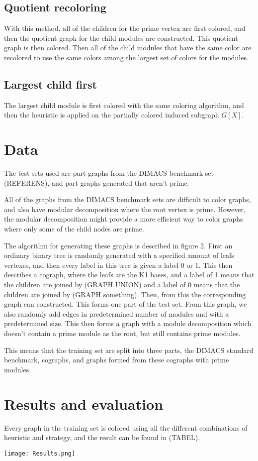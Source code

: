 \documentclass{amsart}
\begin{document}
\subsection{Quotient recoloring}

With this method, all of the children for the prime vertex are first colored,
and then the quotient graph for the child modules are constructed. This quotient
graph is then colored. Then all of the child modules that have the same color
are recolored to use the same colors among the largest set of colors for the
modules.



\subsection{Largest child first}

The largest child module is first colored with the same coloring algorithm, and
then the heuristic is applied on the partially colored induced subgraph 
$G[X]$.


\section{Data}
\label{sec:Data}

The test sets used are part graphs from the DIMACS benchmark set (REFERENS), 
and part graphs generated that aren't prime.

All of the graphs from the DIMACS benchmark sets are difficult to color graphs,
and also have modular decomposition where the root vertex is prime. However, the
modular decomposition might provide a more efficient way to color graphs where
only some of the child nodes are prime. 

The algorithm for generating these graphs is described in figure 2. First an
ordinary binary tree is randomly generated with a specified amount of leafs
vertexes, and then every label in this tree is given a label 0 or 1.  This then
describes a cograph, where the leafs are the K1 bases, and a label of 1 means
that the children are joined by (GRAPH UNION) and a label of 0 means that the
children are joined by (GRAPH something). Then, from this the corresponding
graph can constructed. This forms one part of the test set. From this graph, we
also randomly add edges in predetermined number of modules and with a
predetermined size. This then forms a graph with a module decomposition which
doesn't contain a prime module as the root, but still contains prime modules.

This means that the training set are split into three parts, the DIMACS standard
benchmark, cographs, and graphs formed from these cographs with prime modules.

\section{Results and evaluation}
\label{sec:Result}
Every graph in the training set is colored using all the different combinations
of heuristic and strategy, and the result can be found in (TABEL).

\texttt{[image: Results.png]}

\printbibliography
\end{document}
